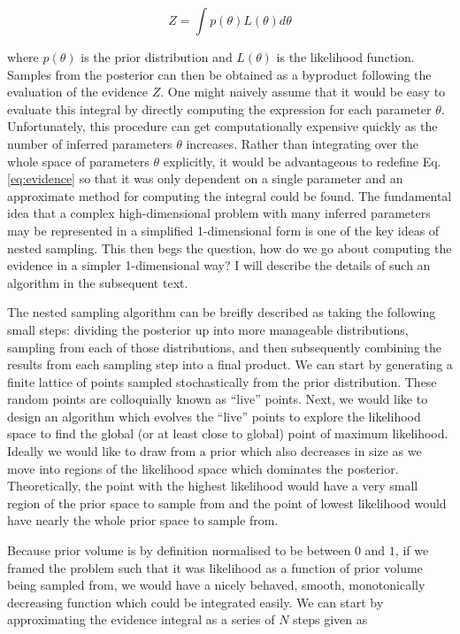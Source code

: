 \begin{equation}
    Z = \int p(\theta) L(\theta) d\theta \label{eq:evidence}
\end{equation}

where $p(\theta)$ is the prior distribution and $L(\theta)$ is the likelihood function. Samples from the posterior can then be obtained as a byproduct following the evaluation of the evidence $Z$. One might naively assume that it would be easy to evaluate this integral by directly computing the expression for each parameter $\theta$. Unfortunately, this procedure can get computationally expensive quickly as the number of inferred parameters $\theta$ increases. Rather than integrating over the whole space of parameters $\theta$ explicitly, it would be advantageous to redefine Eq. \ref{eq:evidence} so that it was only dependent on a single parameter and an approximate method for computing the integral could be found. The fundamental idea that a complex high-dimensional problem with many inferred parameters may be represented in a simplified 1-dimensional form is one of the key ideas of nested sampling. This then begs the question, how do we go about computing the evidence in a simpler 1-dimensional way? I will describe 
the details of such an algorithm in the subsequent text.

The nested sampling algorithm can be breifly described as taking the following
small steps: dividing the posterior up into more manageable distributions, 
sampling from each of those distributions, and then subsequently combining the 
results from each sampling step into a final product. We can start by generating a finite lattice of points sampled stochastically from the prior distribution. These random points are colloquially known as ``live'' points. Next, we would like to design an algorithm which evolves the ``live'' points to explore the likelihood space to find the global (or at least close to global) point of maximum likelihood. Ideally we would like to draw from a prior which also decreases in size as we move into regions of the likelihood space which dominates the posterior. Theoretically, the point with the highest likelihood would have a very small region of the prior space to sample from and the point of lowest likelihood would have nearly the whole prior space to sample from.


%
%
Because prior volume is by definition normalised to be between $0$ and $1$,
if we framed the problem such that it was likelihood as a function of 
prior volume being sampled from, we would have a nicely behaved, 
smooth, monotonically decreasing function which could be integrated easily. 
We can start by approximating the evidence integral as a series of $N$ 
steps given as 

